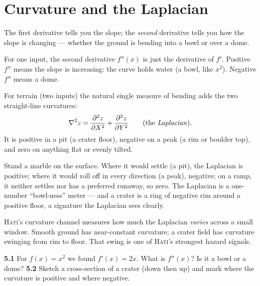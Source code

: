 \documentclass[11pt,oneside]{book}
\begin{document}
\chapter{Curvature and the Laplacian}

The first derivative tells you the slope; the \emph{second} derivative tells you how
the slope is changing --- whether the ground is bending into a bowl or over a dome.

For one input, the second derivative $f''(x)$ is just the derivative of $f'$. Positive
$f''$ means the slope is increasing: the curve holds water (a bowl, like $x^2$).
Negative $f''$ means a dome.

For terrain (two inputs) the natural single measure of bending adds the two
straight-line curvatures:
\begin{equation}
\nabla^2 z=\frac{\partial^2 z}{\partial X^2}+\frac{\partial^2 z}{\partial Y^2}
\qquad\text{(the \emph{Laplacian}).}
\end{equation}
It is positive in a pit (a crater floor), negative on a peak (a rim or boulder top),
and zero on anything flat or evenly tilted.

\begin{intuition}
Stand a marble on the surface. Where it would settle (a pit), the Laplacian is
positive; where it would roll off in every direction (a peak), negative; on a ramp, it
neither settles nor has a preferred runaway, so zero. The Laplacian is a one-number
``bowl-ness'' meter --- and a crater is a ring of negative rim around a positive floor,
a signature the Laplacian sees clearly.
\end{intuition}

\begin{hatibox}
\textsc{Hati}'s curvature channel measures how much the Laplacian \emph{varies} across
a small window. Smooth ground has near-constant curvature; a crater field has curvature
swinging from rim to floor. That swing is one of \textsc{Hati}'s strongest hazard
signals.
\end{hatibox}

\begin{practice}
\textbf{5.1} For $f(x)=x^2$ we found $f'(x)=2x$. What is $f''(x)$? Is it a bowl or a
dome? \quad\textbf{5.2} Sketch a cross-section of a crater (down then up) and mark
where the curvature is positive and where negative.
\end{practice}

\end{document}
